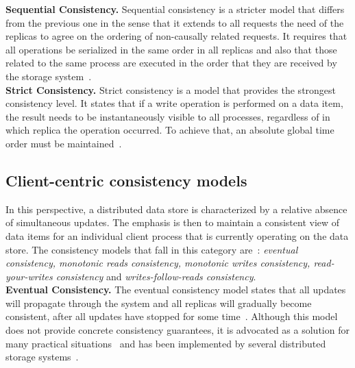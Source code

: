\noindent \textbf{Sequential Consistency.}
Sequential consistency is a stricter model that differs from the previous one in the sense that it extends to all requests the need of the replicas to agree on the ordering of non-causally related requests. It requires  that all operations be serialized in the same order in all replicas and also that those related to the same process are executed in the order that they are received by the storage system~\cite{tanenbaum:2007}. \\

\noindent \textbf{Strict Consistency.}
Strict consistency is a mod\-el that provides the strongest consistency level. It states that if a write operation is performed on a data item, the result needs to be instantaneously visible to all processes, regardless of in which replica the operation occurred. To achieve that, an absolute global time order must be maintained~\cite{tanenbaum:2007}.

\subsection{Client-centric consistency models}

In this perspective, a distributed data store is characterized by a relative absence of simultaneous updates.
The emphasis is then to maintain a consistent view of data items for an individual client process that is currently operating on the data store. 
The consistency models that fall in this category are~\cite{tanenbaum:2007}: \textit{eventual consistency, monotonic reads consistency, monotonic writes consistency, read-your-writes consistency} and \textit{writes-follow-reads consistency}. \\

\noindent \textbf{Eventual Consistency.}
The eventual consistency mod\-el states that all updates will propagate through the system and all replicas will gradually become consistent, after all updates have stopped for some time~\cite{tanenbaum:2007, Vogels:2009}. Although this model does not provide concrete consistency guarantees, it is advocated  as a solution for many practical situations~\cite{BailisVFHS12,BailisVFHS14,balegas2015putting,Chihoub2014,Vogels:2009} and has been implemented by several distributed storage systems~\cite{Chang06bigtable:a, decandia2007dynamo, Ghemawat2003Google, lakshman2010cassandra}. \\

